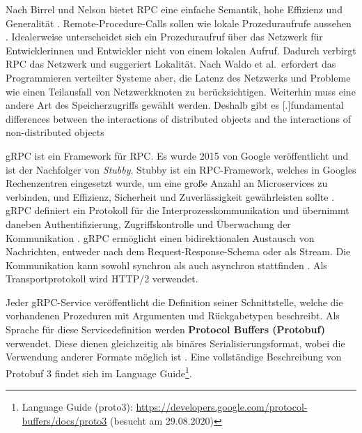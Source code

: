 Nach Birrel und Nelson bietet RPC eine einfache Semantik, hohe Effizienz und Generalität \autocite{Birrell1984}. Remote-Procedure-Calls sollen wie lokale Prozeduraufrufe aussehen \autocite{RFC707}. Idealerweise unterscheidet sich ein Prozeduraufruf über das Netzwerk für Entwicklerinnen und Entwickler nicht von einem lokalen Aufruf. Dadurch verbirgt RPC das Netzwerk und suggeriert Lokalität. Nach Waldo et al.\ erfordert das Programmieren verteilter Systeme aber, die Latenz des Netzwerks und Probleme wie einen Teilausfall von Netzwerkknoten zu berücksichtigen. Weiterhin muss eine andere Art des Speicherzugriffs gewählt werden. Deshalb gibt es [.]{fundamental differences between the interactions of distributed objects and the interactions of non-distributed objects}

\para{}gRPC ist ein Framework für RPC. Es wurde 2015 von Google veröffentlicht und ist der Nachfolger von \textit{Stubby}. Stubby ist ein RPC-Framework, welches in Googles Rechenzentren eingesetzt wurde, um eine große Anzahl an Microservices zu verbinden, und Effizienz, Sicherheit und Zuverlässigkeit gewährleisten sollte \autocite{gRPC_Motivation}. gRPC definiert ein Protokoll für die Interprozesskommunikation und übernimmt daneben Authentifizierung, Zugriffskontrolle und Überwachung der Kommunikation \autocite[S.~3]{Indrasiri2020}. gRPC ermöglicht einen bidirektionalen Austausch von Nachrichten, entweder nach dem Request-Response-Schema oder als Stream. Die Kommunikation kann sowohl synchron als auch asynchron stattfinden \autocite[S.~2]{Indrasiri2020}. Als Transportprotokoll wird HTTP/2 verwendet.

\para{}Jeder gRPC-Service veröffentlicht die Definition seiner Schnittstelle, welche die vorhandenen Prozeduren mit Argumenten und Rückgabetypen beschreibt. Als Sprache für diese Servicedefinition werden \textbf{Protocol Buffers (Protobuf)} verwendet. Diese dienen gleichzeitig als binäres Serialisierungsformat, wobei die Verwendung anderer Formate möglich ist \autocite[S.~4]{Indrasiri2020}. Eine vollständige Beschreibung von Protobuf 3 findet sich im Language Guide\footnote{Language Guide (proto3): \url{https://developers.google.com/protocol-buffers/docs/proto3} (besucht am 29.08.2020)}.

